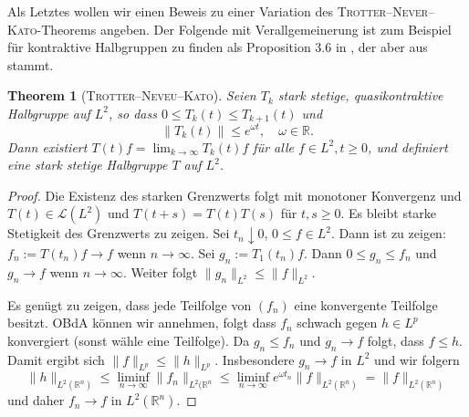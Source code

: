 \documentclass[11pt,twoside,a4paper]{article}
\newtheorem{thm}{Theorem}
\theoremstyle{break}
\begin{document}
Als Letztes wollen wir einen Beweis zu einer Variation des \textsc{Trotter--Never--Kato}-Theorems angeben.  Der Folgende mit Verallgemeinerung ist zum Beispiel für kontraktive Halbgruppen zu finden als Proposition 3.6 in \cite{arendt-goldstein}, der aber aus \cite{voigt} stammt.

\vspace{.25cm}

\begin{thm}[\textsc{Trotter--Neveu--Kato}]
Seien $T_k$ stark stetige, quasikontraktive Halbgruppe  auf $L^2$, so dass $0\le T_k(t) \le T_{k+1}(t)$ und
\begin{equation}
\|T_k(t)\|\le e^{\omega t},\quad \omega \in \mathbb R.
\end{equation}  
Dann existiert $T(t)f=\lim_{k\to \infty} T_k(t)f$ für alle $f\in L^2, t\ge 0$, und definiert eine stark stetige Halbgruppe $T$ auf $L^2$. 
\end{thm}

\begin{proof}
Die Existenz des starken Grenzwerts folgt mit monotoner Konvergenz und $T(t)\in \mathcal L(L^2)$ und $T(t+s)=T(t) T(s)$ für $t,s\ge 0$.  Es bleibt starke Stetigkeit des Grenzwerts zu zeigen.  Sei $t_n\downarrow 0$, $0\le f\in L^2$.  Dann ist zu zeigen: $f_n:=T(t_n)f\to f$ wenn $n\to \infty$. Sei $g_n:=T_1(t_n) f$. Dann $0\le g_n \le f_n$ und $g_n \to f$ wenn $n\to \infty$. Weiter folgt $\|g_n\|_{L^2} \le \|f\|_{L^2}$.

Es genügt zu zeigen, dass jede Teilfolge von $(f_n)$ eine konvergente Teilfolge besitzt.  OBdA können wir annehmen, folgt dass $f_n$ schwach gegen $h\in L^p$ konvergiert (sonst wähle eine Teilfolge).  Da $g_n \le f_n$ und $g_n \to f$ folgt, dass $f\le h$.  Damit ergibt sich $\| f\|_{L^p}\le \|h\|_{L^p}$. 
Insbesondere $g_n \to f$ in $L^2$ und wir folgern
\begin{equation}
\| h\|_{L^2(\mathbb R^n)}  \le \liminf_{n\to \infty} \| f_n\|_{L^2(\mathbb R^n}\le \liminf_{n\to \infty} e^{\omega t_n} \|f\|_{L^2(\mathbb R^n)}=\| f\|_{L^2(\mathbb R^n)}
\end{equation}
und daher $f_n\to f$ in $L^2(\mathbb R^n)$.
\end{proof}
 
\end{document}
